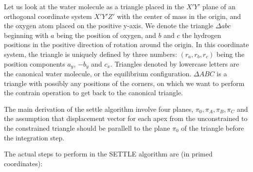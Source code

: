 Let us look at the water molecule as a triangle placed in the $X'Y'$ plane of an orthogonal coordinate system $X'Y'Z'$	with the center of mass in the origin, and the oxygen atom placed on the positive y-axis. We denote the triangle $\Delta abc$ beginning with $a$ being the position of oxygen, and $b$ and $c$ the hydrogen positions in the positive direction of rotation around the origin.  In this coordinate system, the triangle is uniquely defined by three numbers: $(r_a, r_b, r_c)$ being the position components $a_y$, $-b_y$ and $c_x$. Triangles denoted by lowercase letters are the canonical water molecule, or the equilibrium configuration. $\Delta ABC$ is a triangle with possibly any positions of the corners, on which we want to perform the contrain operation to get back to the canonical triangle. 

The main derivation of the settle algorithm involve four planes, $\pi_0, \pi_A, \pi_B, \pi_C$ and the assumption that displacement vector for each apex from the unconstrained to the constrained triangle should be parallell to the plane $\pi_0$ of the triangle before the integration step. 

The actual steps to perform in the SETTLE algorithm are (in primed coordinates):
